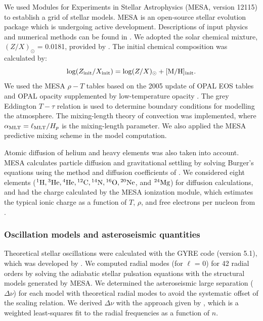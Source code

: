 \documentclass[a4paper,fleqn,usenatbib]{mnras}
\newcommand{\dnu}{\ensuremath{\Delta\nu}}
\begin{document}
We used Modules for Experiments in Stellar Astrophysics
(\textsc{MESA}, version 12115) to establish a grid of stellar models. 
\textsc{MESA} is an open-source stellar evolution package which is undergoing active development. 
Descriptions of input physics and numerical methods
can be found in \citet{Paxton.Bildsten.ea2011, Paxton.Cantiello.ea2013, Paxton.Marchant.ea2015, Paxton.Schwab.ea2018, Paxton.Smolec.ea2019}.
We adopted the solar chemical mixture, $(Z/X)_{\odot}$ = 0.0181,
 provided by \citet{Asplund.Grevesse.ea2009}. 
The initial chemical composition was calculated by:
%
\begin{equation}
\log (Z_{\rm{init}}/X_{\rm{init}}) = \log (Z/X)_{\odot} + \rm{[M/H]_{init}}.  \\
\end{equation}
%
We used the \textsc{MESA} $\rho-T$ tables based on the 2005
update of OPAL EOS tables \citep{Rogers.Nayfonov2002} and OPAL opacity
supplemented by low-temperature opacity \citep{Ferguson.Alexander.ea2005}. The grey Eddington $T-\tau$ relation is used to determine boundary conditions for modelling the atmosphere. The mixing-length theory of convection was implemented, where 
$\alpha_{\rm MLT} = \ell_{\rm MLT}/H_p$ is the mixing-length parameter. 
We also applied the \textsc{MESA} predictive mixing scheme \citep{Paxton.Schwab.ea2018, Paxton.Smolec.ea2019} in the model computation. 

Atomic diffusion of helium and heavy elements was also taken into account. \textsc{MESA} calculates particle diffusion and gravitational settling by solving Burger's equations using the method
and diffusion coefficients of \citet{Thoul.Bahcall.ea1994}. We considered eight elements (${}^1{\rm H}, {}^3{\rm He}, {}^4{\rm He}, {}^{12}{\rm C}, {}^{14}{\rm N}, {}^{16}{\rm O}, {}^{20}{\rm Ne}$, and ${}^{24}{\rm Mg}$)
for diffusion calculations, and had the charge calculated by the \textsc{MESA} ionization module, which estimates the typical ionic charge as a function of $T$, $\rho$, and free electrons per nucleon from \citet{Paquette.Pelletier.ea1986}.

\subsubsection{Oscillation models and asteroseismic quantities}\label{subsec:seismo_model}

Theoretical stellar oscillations were calculated with the \textsc{GYRE} code (version 5.1), which was developed by \citet{Townsend.Teitler2013}. We computed radial modes (for $\ell$ = 0) for 42 radial orders by solving the adiabatic stellar pulsation equations with the structural models generated by \textsc{MESA}. We determined the asteroseismic large separation ($\dnu$) for each model with theoretical radial modes to avoid the systematic offset of the scaling relation. We derived $\Delta \nu$ with the approach given by \citet{White.Bedding.ea2011}, which is a weighted least-squares fit to the radial frequencies as a function of $n$.
\end{document}
